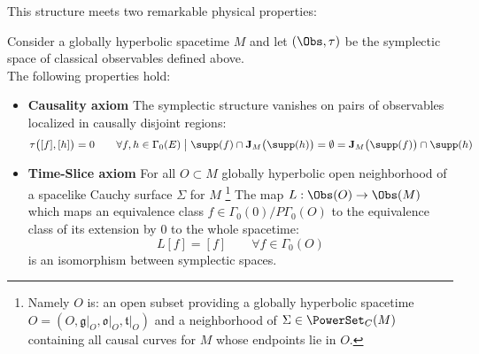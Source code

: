 \documentclass[Main]{subfiles}
\begin{document}
				This structure meets two remarkable physical properties:
				\begin{theorem}\label{Teo:CausalityTimeSliceAxioms}
					Consider a globally hyperbolic spacetime $M$ and let $(\Obs,\tau)$ be the symplectic space of classical observables defined above.\\
					The following properties hold:
					\begin{itemize}
						\item \textbf{Causality axiom}
							The symplectic structure vanishes on pairs of observables localized in causally disjoint regions:
							\begin{displaymath}
								\tau \big( [f],[h] \big) =0 \qquad
								\forall f,h \in \Gamma_0(E) \; \big\vert \; \supp(f) \cap \textbf{J}_M \big(\supp(h) \big) = \emptyset = 
								\textbf{J}_M \big(\supp(f) \big) \cap \supp(h)
							\end{displaymath}
						\item \textbf{Time-Slice axiom}
							For all $O \subset M$ globally hyperbolic open neighborhood of a spacelike Cauchy surface $\Sigma$ for $M$ \footnote{Namely $O$ is: an open subset providing a globally hyperbolic spacetime $O = (O,\mathfrak{g}\vert_O,\mathfrak{o}\vert_O, \mathfrak{t}\vert_O)$ and a neighborhood of $\Sigma \in \PowerSet_C(M)$ containing all causal curves for $M$ whose endpoints lie in $O$. }
							The map $L : \Obs( O) \rightarrow \Obs(M)$ which maps an equivalence class $ f \in \Gamma_0(0)\big / P \Gamma_0(O)$ to the equivalence class of its extension by $0$ to the whole spacetime:
							\begin{displaymath}
							 L[f] = [f] \qquad \forall f \in \Gamma_0(O)
							\end{displaymath}				
							is an isomorphism between symplectic spaces.
					\end{itemize}
				\end{theorem}
\end{document}

